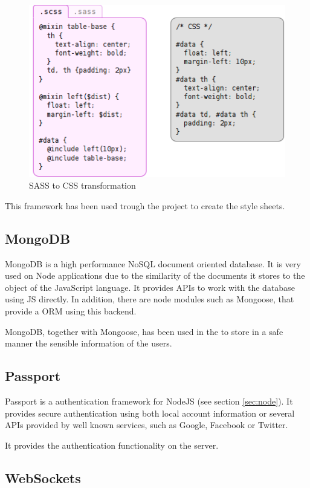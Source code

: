 \begin{figure}[ht]
  \centering
  \includegraphics[width=.7\textwidth]{fig/sass}
  \caption{SASS to CSS transformation}
  \label{fig:sass}
\end{figure} 

This framework has been used trough the project to create the style sheets.

\subsection*{MongoDB}

MongoDB \cite{mongodb} is a high performance NoSQL document oriented database. It is very used on Node applications due to the similarity of the documents it stores to the object of the JavaScript language. It provides APIs to work with the database using JS directly. In addition, there are node modules such as Mongoose, that provide a ORM using this backend.

MongoDB, together with Mongoose, has been used in the to store in a safe manner the sensible information of the users.

\subsection*{Passport}

Passport is a authentication framework for NodeJS (see section \ref{sec:node}). It provides secure authentication using both local account information or several APIs provided by well known services, such as Google, Facebook or Twitter.

It provides the authentication functionality on the server.

\subsection*{WebSockets}

